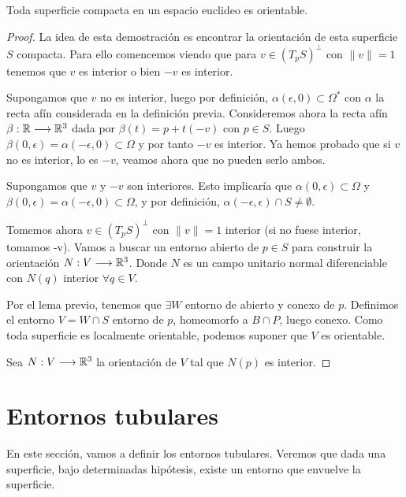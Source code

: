 \begin{theorem}
Toda superficie compacta en un espacio euclideo es orientable.
\end{theorem}
\begin{proof}
La idea de esta demostración es encontrar la orientación de esta superficie $S$ compacta. Para ello comencemos viendo que para $v \in (T_pS)^{\bot}$ con $\parallel v \parallel=1$ tenemos que $v$ es interior o bien $-v$ es interior.

Supongamos que $v$ no es interior, luego por definición, $\alpha(\epsilon, 0) \subset \Omega^{*}$ con $\alpha$ la recta afín considerada en la definición previa. Consideremos ahora la recta afín $\beta: \mathbb{R} \longrightarrow \mathbb{R}^3$ dada por $\beta(t)=p + t(-v)$ con $p \in S$. Luego $\beta(0, \epsilon) = \alpha(-\epsilon, 0) \subset \Omega$ y por tanto $-v$ es interior. Ya hemos probado que si $v$ no es interior, lo es $-v$, veamos ahora que no pueden serlo ambos. 

Supongamos que $v$ y $-v$ son interiores. Esto implicaría que $\alpha(0,\epsilon) \subset \Omega$ y $\beta(0, \epsilon) = \alpha(-\epsilon, 0) \subset \Omega$, y por definición, $\alpha(-\epsilon, \epsilon) \cap S \neq \emptyset$.

Tomemos ahora $v \in (T_pS)^{\bot}$ con $\parallel v \parallel=1$ interior (si no fuese interior, tomamos -v). Vamos a buscar un entorno abierto de $p \in S$ para construir la orientación $N: V \longrightarrow \mathbb{R}^3$. Donde $N$ es un campo unitario normal diferenciable con $N(q)$ interior $\forall q \in V.$

Por el lema previo, tenemos que $\exists W$ entorno de abierto y conexo de $p$. Definimos el entorno $V=W\cap S$ entorno de $p$, homeomorfo a $B\cap P$, luego conexo. Como toda superficie es localmente orientable, podemos suponer que $V$ es orientable.

Sea $N: V \longrightarrow \mathbb{R}^3$ la orientación de $V$ tal que $N(p)$ es interior.

\end{proof}

\section{Entornos tubulares}

En este sección, vamos a definir los entornos tubulares. Veremos que dada una superficie, bajo determinadas hipótesis, existe un entorno que envuelve la superficie.

